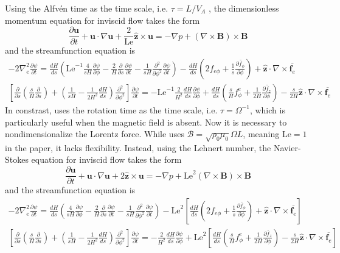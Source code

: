 Using the Alfvén time as the time scale, i.e. $\tau = L/V_A$ \parencite{holdenried-chernoff_long_2021}, the dimensionless momentum equation for inviscid flow takes the form
\[
    \frac{\partial \mathbf{u}}{\partial t} + \mathbf{u}\cdot \nabla \mathbf{u} + \frac{2}{\mathrm{Le}}\hat{\mathbf{z}}\times \mathbf{u} = -\nabla p + (\nabla\times\mathbf{B})\times \mathbf{B}
\]
and the streamfunction equation is
\[\begin{gathered}
    -2\nabla_e^2 \frac{\partial \psi}{\partial t} = \frac{dH}{ds} \left(\mathrm{Le}^{-1}\frac{4}{sH}\frac{\partial \psi}{\partial \phi} - \frac{2}{H}\frac{\partial}{\partial s}\frac{\partial \psi}{\partial t} - \frac{1}{sH}\frac{\partial^2}{\partial \phi^2}\frac{\partial \psi}{\partial t}\right) - \frac{dH}{ds}\left(2f_{e\phi} + \frac{1}{s}\frac{\partial \widetilde{f_\phi}}{\partial \phi}\right) + \hat{\mathbf{z}}\cdot \nabla\times \overline{\mathbf{f}_e} \\ 
    \left[\frac{\partial}{\partial s}\left(\frac{s}{H}\frac{\partial}{\partial s}\right) + \left(\frac{1}{sH} - \frac{1}{2H^2} \frac{dH}{ds}\right)\frac{\partial^2}{\partial \phi^2}\right] \frac{\partial \psi}{\partial t} = - \mathrm{Le}^{-1}\frac{2}{H^2}\frac{dH}{ds} \frac{\partial \psi}{\partial \phi} + \frac{dH}{ds} \left(\frac{s}{H} f_\phi^e + \frac{1}{2H}\frac{\partial \widetilde{f_z}}{\partial \phi}\right) - \frac{s}{2H}\hat{\mathbf{z}}\cdot \nabla\times \overline{\mathbf{f}_e}
\end{gathered}
\]
In constrast, \textcite{jackson_plesio-geostrophy_2020} uses the rotation time as the time scale, i.e. $\tau = \Omega^{-1}$, which is particularly useful when the magnetic field is absent. Now it is necessary to nondimensionalize the Lorentz force. While \textcite{jackson_plesio-geostrophy_2020} uses $\mathscr{B} = \sqrt{\rho_0 \mu_0} \Omega L$, meaning $\mathrm{Le} = 1$ in the paper, it lacks flexibility. Instead, using the Lehnert number, the Navier-Stokes equation for inviscid flow takes the form
\[
    \frac{\partial \mathbf{u}}{\partial t} + \mathbf{u}\cdot \nabla \mathbf{u} + 2\hat{\mathbf{z}}\times \mathbf{u} = -\nabla p + \mathrm{Le}^2(\nabla\times\mathbf{B})\times \mathbf{B}
\]
and the streamfunction equation is
\[\begin{gathered}
    -2\nabla_e^2 \frac{\partial \psi}{\partial t} = \frac{dH}{ds} \left(\frac{4}{sH}\frac{\partial \psi}{\partial \phi} - \frac{2}{H}\frac{\partial}{\partial s}\frac{\partial \psi}{\partial t} - \frac{1}{sH}\frac{\partial^2}{\partial \phi^2}\frac{\partial \psi}{\partial t}\right) - \mathrm{Le}^2 \left[\frac{dH}{ds}\left(2f_{e\phi} + \frac{1}{s}\frac{\partial \widetilde{f_\phi}}{\partial \phi}\right) + \hat{\mathbf{z}}\cdot \nabla\times \overline{\mathbf{f}_e}\right] \\ 
    \left[\frac{\partial}{\partial s}\left(\frac{s}{H}\frac{\partial}{\partial s}\right) + \left(\frac{1}{sH} - \frac{1}{2H^2} \frac{dH}{ds}\right)\frac{\partial^2}{\partial \phi^2}\right] \frac{\partial \psi}{\partial t} = - \frac{2}{H^2}\frac{dH}{ds} \frac{\partial \psi}{\partial \phi} + \mathrm{Le}^2 \left[\frac{dH}{ds} \left(\frac{s}{H} f_\phi^e + \frac{1}{2H}\frac{\partial \widetilde{f_z}}{\partial \phi}\right) - \frac{s}{2H}\hat{\mathbf{z}}\cdot \nabla\times \overline{\mathbf{f}_e}\right]
\end{gathered}
\]
